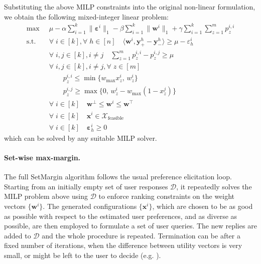\documentclass{article}
\renewcommand\[{\begin{equation}}
\renewcommand\]{\end{equation}}
\newcommand{\calvar}[1]{\ensuremath{\mathcal{#1}}}
\newcommand{\calD}{\calvar{D}}
\newcommand{\calX}{\calvar{X}}
\newcommand{\vecvar}[1]{\ensuremath{\boldsymbol{#1}}}
\newcommand{\vw}{\vecvar{w}}
\newcommand{\vx}{\vecvar{x}}
\newcommand{\vy}{\vecvar{y}}
\newcommand{\veps}{\vecvar{\varepsilon}}
\begin{document}
Substituting the above MILP constraints into the original non-linear
formulation, we obtain the following mixed-integer linear problem:
%
{\footnotesize
\begin{align}
    \max
        & \;\; \mu - \alpha \sum_{i=1}^k \| \veps^{i} \|_1 - \beta \sum_{i=1}^k \| \vw^{i} \|_1 + \gamma \sum_{i=1}^k \sum_{z=1}^m p^{i,i}_z
        \nonumber
    \\
    \text{s.t.}
        & \;\; \forall \; i \in [k], \forall \; h \in [n] \quad \langle \vw^{i}, \vy^{h}_+ - \vy^{h}_- \rangle \ge \mu - \varepsilon^{i}_h \nonumber
    \\
        & \;\; \forall \; i, j \in [k], i \neq j \quad \sum_{z=1}^m p^{i,i}_z - p^{i,j}_z \ge \mu
    \\
        & \;\; \forall \; i, j \in [k], i \neq j, \forall \; z \in [m] \nonumber
    \\
        & \;\; \qquad p^{i,i}_z \le \min \{ w_\text{max} x^{i}_z, \, w^{i}_z \}
    \\
        & \;\; \qquad p^{i,j}_z \ge \max \{ 0, \, w^{i}_z - w_\text{max}(1 - x^{j}_z) \}
    \\
        & \;\; \forall \; i \in [k] \quad \vw^\bot \le \vw^{i} \le \vw^\top \label{eq:wbounds2}
    \\
        & \;\; \forall \; i \in [k] \quad \vx^{i} \in \calX_{\text{feasible}} \nonumber
    \\
        & \;\; \forall \; i \in [k] \quad \veps^{i}_h \ge 0 \nonumber
\end{align}
}
%
which can be solved by any suitable MILP solver.

\paragraph{Set-wise max-margin.} The full {\sc SetMargin} algorithm
follows the usual preference elicitation loop. Starting from an
initially empty set of user responses $\calD$, it repeatedly solves
the MILP problem above using $\calD$ to enforce ranking
constraints on the weight vectors $\{\vw^i\}$. The generated
configurations $\{\vx^i\}$, which are chosen to be as good as possible
with respect to the estimated user preferences, and as diverse as
possible, are then employed to formulate a set of user queries. The
new replies are added to $\calD$ and the whole procedure is
repeated. Termination can be after a fixed number of iterations,
when the difference between utility vectors is very small, or might be left
to the user to decide (e.g. \cite{Reilly2007}).
\end{document}
